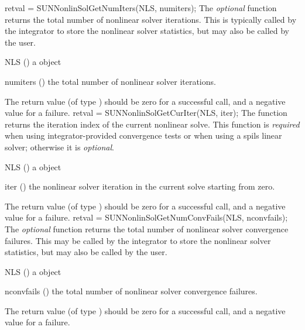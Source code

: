 {
  retval = SUNNonlinSolGetNumIters(NLS, numiters);
}
{
  The \textit{optional} function  returns
  the total number of nonlinear solver iterations. This is typically
  called by the {\sundials} integrator to store the nonlinear solver
  statistics, but may also be called by the user.
}
{
  \begin{args}[numiters]
  \item[NLS] ()
    a {\sunnonlinsol} object
  \item[numiters] ()
    the total number of nonlinear solver iterations.
  \end{args}
}
{
  The return value  (of type ) should be zero for a
  successful call, and a negative value for a failure.
}
{}
{
  retval = SUNNonlinSolGetCurIter(NLS, iter);
}
{
  The function  returns the iteration index
  of the current nonlinear solve. This function is \textit{required}
  when using {\sundials} integrator-provided convergence tests or
  when using a {\sunlinsol} spils linear solver; otherwise it is 
  \textit{optional}.
}
{
  \begin{args}[numiters]
  \item[NLS] ()
    a {\sunnonlinsol} object
  \item[iter] ()
    the nonlinear solver iteration in the current solve starting from
    zero.
  \end{args}
}
{
  The return value  (of type ) should be zero for a
  successful call, and a negative value for a failure.
}
{}
{
  retval = SUNNonlinSolGetNumConvFails(NLS, nconvfails);
}
{
  The \textit{optional} function  returns
  the total number of nonlinear solver convergence failures. This may be
  called by the {\sundials} integrator to store the nonlinear solver
  statistics, but may also be called by the user.
}
{
  \begin{args}[nconvfails]
  \item[NLS] ()
    a {\sunnonlinsol} object
  \item[nconvfails] ()
    the total number of nonlinear solver convergence failures.
  \end{args}
}
{
  The return value  (of type ) should be zero for a
  successful call, and a negative value for a failure.
}
{}

